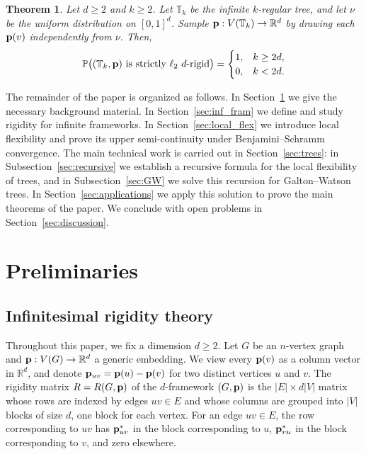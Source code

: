 \documentclass[reqno,english]{amsart}
\numberwithin{equation}{section}
\newtheorem{theorem}{Theorem}[section]
\theoremstyle{definition}{
\newtheorem{example}[theorem]{Example}
\newtheorem{definition}[theorem]{Definition}
\newtheorem*{definition*}{Definition}
\newtheorem{problem}[theorem]{Problem}
\newtheorem{question}[theorem]{Question}
}
\renewcommand{\P}{\mathbb P}
\newcommand{\bbT}{\mathbb T}
\newcommand{\R}{\mathbb R}
\newcommand{\p}{{\bf p}}
\begin{document}
\begin{theorem}\label{thm:Tk}
    Let \(d\ge 2\) and \(k\ge 2\). Let \(\bbT_k\) be the infinite
    \(k\)-regular tree, and let \(\nu\) be the uniform distribution on
    \([0,1]^d\). Sample \(\p:V(\bbT_k)\to\R^d\) by drawing each
    \(\p(v)\) independently from \(\nu\). Then,
    \[
    \P\big((\bbT_k,\p)\text{ is strictly \(\ell_2\) \(d\)-rigid}\big)
    =
    \begin{cases}
        1, & k\ge 2d,\\
        0, & k<2d.
    \end{cases}
\]
\end{theorem}

\medskip

The remainder of the paper is organized as follows. In
Section~\ref{sec:preliminaries} we give the necessary background material.
In Section~\ref{sec:inf_fram} we define and study rigidity for infinite
frameworks. In Section~\ref{sec:local_flex} we introduce local flexibility
and prove its upper semi-continuity under Benjamini--Schramm convergence.
The main technical work is carried out in Section~\ref{sec:trees}: in
Subsection~\ref{sec:recursive} we establish a recursive formula for the
local flexibility of trees, and in Subsection~\ref{sec:GW} we solve this
recursion for Galton--Watson trees. In Section~\ref{sec:applications} we
apply this solution to prove the main theorems of the paper. We conclude
with open problems in Section~\ref{sec:discussion}.



\section{Preliminaries}\label{sec:preliminaries}
\subsection{Infinitesimal rigidity theory}
Throughout this paper, we fix a dimension $d\ge 2$. Let $G$ be an $n$-vertex graph and $\p:V(G)\to\R^d$ a generic embedding. We view every $\p(v)$ as a column vector in $\R^d$, 
and denote $\p_{uv}=\p(u)-\p(v)$ for two distinct vertices $u$ and $v$. 
The rigidity matrix $R = R(G,\p)$ of the $d$-framework $(G,\p)$ is the $|E| \times d|V|$ matrix whose rows are indexed by edges $uv \in E$ and whose columns are grouped into $|V|$ blocks of size $d$, one block for each vertex. 
For an edge $uv \in E$, the row corresponding to $uv$ has $\p_{uv}^*$ in the block corresponding to $u$, $\p_{vu}^*$ in the block corresponding to $v$, and zero elsewhere.
\end{document}
